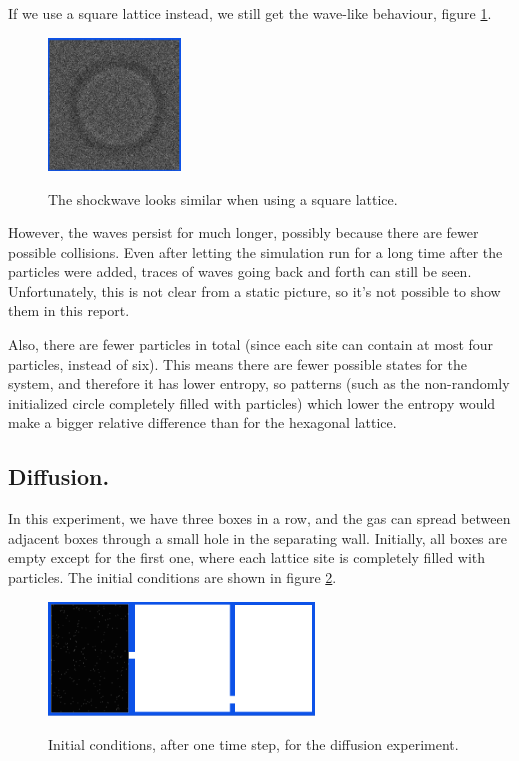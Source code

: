 \documentclass[12pt,a4paper]{article}
\begin{document}

If we use a square lattice instead, we still get the wave-like behaviour, figure \ref{squarewave}.
\begin{figure}[htp]
\caption{The shockwave looks similar when using a square lattice.}
\centering
  \includegraphics[width=100pt]{figs/squarewave.png}
\label{squarewave}
\end{figure}

However, the waves persist for much longer, possibly because there are fewer possible collisions.
Even after letting the simulation run for a long time after the particles were added, traces of waves
going back and forth can still be seen. Unfortunately, this is not clear from a static picture, so
it's not possible to show them in this report.

Also, there are fewer particles in total (since each site can contain at most four particles, instead of six).
This means there are fewer possible states for the system, and therefore it has lower entropy, so patterns
(such as the non-randomly initialized circle completely filled with particles) which lower the entropy would make
a bigger relative difference than for the hexagonal lattice.

\subsection{Diffusion.}
In this experiment, we have three boxes in a row, and the gas can spread between adjacent boxes through a small
hole in the separating wall. Initially, all boxes are empty except for the first one, where each lattice site
is completely filled with particles. The initial conditions are shown in figure \ref{diffusioninit}.

\begin{figure}[htp]
\caption{Initial conditions, after one time step, for the diffusion experiment.}
\centering
  \includegraphics[width=200pt]{figs/diffusioninit.png}
\label{diffusioninit}
\end{figure}
\end{document}

